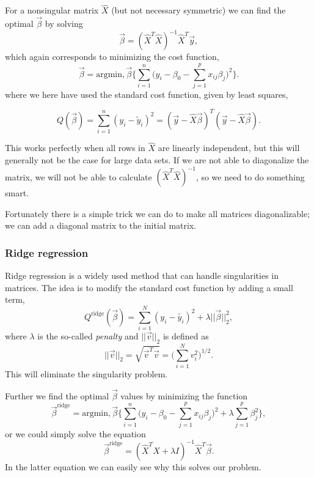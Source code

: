 For a nonsingular matrix $\hat{X}$ (but not necessary symmetric) we can find the optimal $\vec{\beta}$ by solving
\begin{equation}
\vec{\beta}=(\hat{X}^T\hat{X})^{-1}\hat{X}^T\vec{y},
\end{equation}
which again corresponds to minimizing the cost function,
\begin{equation}
\vec{\beta}=\text{argmin},\vec{\beta}\bigg\{\sum_{i=1}^{n}\Big(y_i-\beta_0-\sum_{j=1}^px_{ij}\beta_j\Big)^2\bigg\}.
\end{equation}
where we here have used the standard cost function, given by least squares,

\begin{equation}
Q(\vec{\beta})=\sum_{i=1}^{n}(y_i-\tilde{y}_i)^2=(\vec{y}-\hat{X}\vec{\beta})^T(\vec{y}-\hat{X}\vec{\beta}).
\end{equation}

This works perfectly when all rows in $\hat{X}$ are linearly independent, but this will generally not be the case for large data sets. If we are not able to diagonalize the matrix, we will not be able to calculate $(\hat{X}^T\hat{X})^{-1}$, so we need to do something smart. 

Fortunately there is a simple trick we can do to make all matrices diagonalizable; we can add a diagonal matrix to the initial matrix. 


\subsubsection{Ridge regression} \label{sec:ridge}
Ridge regression is a widely used method that can handle singularities in matrices. The idea is to modify the standard cost function by adding a small term,
\begin{equation}
Q^{\text{ridge}}(\vec{\beta})=\sum_{i=1}^N(y_i-\tilde{y_i})^2+\lambda||\vec{\beta}||_2^2,
\end{equation}
where $\lambda$ is the so-called \textit{penalty} and $||\vec{v}||_2$ is defined as
\begin{equation}
||\vec{v}||_2=\sqrt{\vec{v}^T\vec{v}}=\Big(\sum_{i=1}^Nv_i^2\Big)^{1/2}.
\end{equation}
This will eliminate the singularity problem.

Further we find the optimal $\vec{\beta}$ values by minimizing the function 
\begin{equation}
\vec{\beta}^{\text{ridge}}=\text{argmin},\vec{\beta}\bigg\{\sum_{i=1}^{n}\Big(y_i-\beta_0-\sum_{j=1}^px_{ij}\beta_j\Big)^2+\lambda\sum_{j=1}^p\beta_j^2\bigg\}, 
\end{equation}
or we could simply solve the equation
\begin{equation}
\vec{\beta}^{\text{ridge}}=(\hat{X}^T\hat{X}+\lambda I)^{-1}\hat{X}^T\vec{\beta}.
\end{equation}
In the latter equation we can easily see why this solves our problem.

